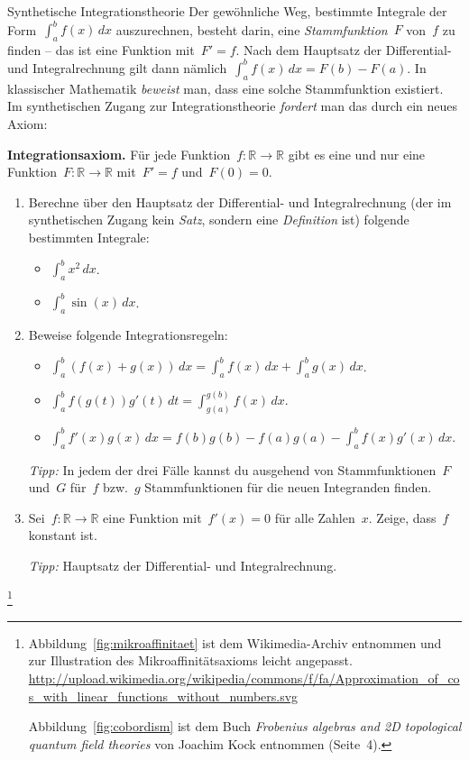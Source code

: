 \documentclass[twoside]{../zirkelblatt}
\newcommand{\RR}{\mathbb{R}}
\theoremstyle{definition}
\theoremstyle{plain}
\theoremstyle{remark}
\begin{document}
\begin{aufgabeShaded}{Synthetische Integrationstheorie}
\label{aufg:integrationstheorie}
Der gewöhnliche Weg, bestimmte Integrale der Form~$\int_a^b f(x) \,dx$
auszurechnen, besteht darin, eine \emph{Stammfunktion}~$F$ von~$f$ zu finden --
das ist eine Funktion mit~$F' = f$. Nach dem Hauptsatz der Differential- und
Integralrechnung gilt dann nämlich~$\int_a^b f(x) \,dx = F(b) - F(a)$. In
klassischer Mathematik \emph{beweist} man, dass eine solche Stammfunktion existiert.
Im synthetischen Zugang zur Integrationstheorie \emph{fordert} man das durch ein
neues Axiom:

\textbf{Integrationsaxiom.} Für jede Funktion~$f : \RR \to \RR$ gibt es eine
und nur eine Funktion~$F : \RR \to \RR$ mit~$F' = f$ und~$F(0) = 0$.

\begin{enumerate}
\item Berechne über den Hauptsatz der Differential- und Integralrechnung (der
im synthetischen Zugang kein \emph{Satz}, sondern eine \emph{Definition} ist)
folgende bestimmten Integrale:
\begin{itemize}
\item $\int_a^b x^2 \,dx$.
\item $\int_a^b \sin(x) \,dx$.
\end{itemize}
\item Beweise folgende Integrationsregeln:
\begin{itemize}
\item $\int_a^b (f(x) + g(x)) \,dx = \int_a^b f(x) \,dx + \int_a^b g(x) \,dx$.
\item $\int_a^b f(g(t)) g'(t) \,dt = \int_{g(a)}^{g(b)} f(x) \,dx$.
\item $\int_a^b f'(x) g(x) \,dx = f(b)g(b) - f(a)g(a) -
  \int_a^b f(x) g'(x) \,dx$.
\end{itemize}

\emph{Tipp:} In jedem der drei Fälle kannst du ausgehend von Stammfunktionen~$F$
und~$G$ für~$f$ bzw.~$g$ Stammfunktionen für die neuen Integranden finden.
\item Sei~$f : \RR \to \RR$ eine Funktion mit~$f'(x) = 0$ für alle Zahlen~$x$.
Zeige, dass~$f$ konstant ist.

\emph{Tipp:} Hauptsatz der Differential- und Integralrechnung.
\end{enumerate}
\end{aufgabeShaded}

\renewcommand{\thefootnotemark}{}
\footnote{Abbildung~\ref{fig:mikroaffinitaet} ist dem Wikimedia-Archiv
entnommen und zur Illustration des Mikroaffinitätsaxioms leicht angepasst.
\url{http://upload.wikimedia.org/wikipedia/commons/f/fa/Approximation_of_cos_with_linear_functions_without_numbers.svg}

\noindent Abbildung~\ref{fig:cobordism} ist dem Buch \emph{Frobenius algebras and 2D
topological quantum field theories} von Joachim Kock entnommen (Seite~4).}
\end{document}

